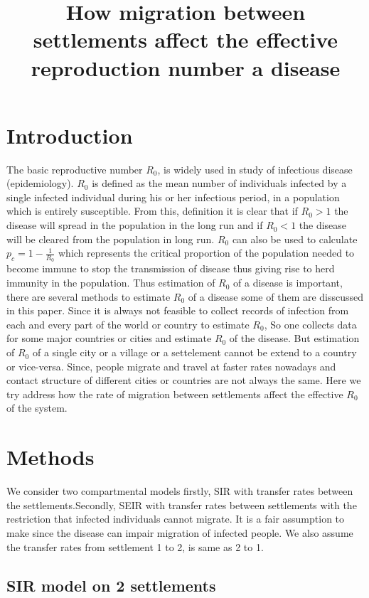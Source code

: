 \documentclass{article}
\begin{document}
\title{How migration between settlements affect the effective
  reproduction number a disease}
\maketitle

\section*{Introduction}
The basic reproductive number $R_{0}$, is widely used in study of
infectious disease (epidemiology). $R_{0}$ is defined as the mean
number of individuals infected by a single infected individual during
his or her infectious period, in a population which is entirely
susceptible. From this, definition it is clear that if $R_{0} > 1$ the
disease will spread in the population in the long run and if $R_{0}<1$
the disease will be cleared from the population in long run. $R_{0}$
can also be used to calculate $p_{c}=1-\frac{1}{R_{0}}$ which
represents the critical proportion of the population needed to become
immune to stop the transmission of disease thus giving rise to herd
immunity in the population.  Thus estimation of $R_{0}$ of a disease
is important, there are several methods to estimate $R_{0}$ of a
disease some of them are disscussed in this paper. Since it is always
not feasible to collect records of infection from each and every part
of the world or country to estimate $R_{0}$, So one collects data for
some major countries or cities and estimate $R_{0}$ of the disease.
But estimation of $R_{0}$ of a single city or a village or a
settelement cannot be extend to a country or vice-versa. Since, people
migrate and travel at faster rates nowadays and contact structure of
different cities or countries are not always the same. Here we try
address how the rate of migration between settlements affect the
effective $R_{0}$ of the system.

\section*{Methods}
We consider two compartmental models firstly, SIR with transfer rates
between the settlements.Secondly, SEIR with transfer rates between
settlements with the restriction that infected individuals cannot
migrate. It is a fair assumption to make since the disease can impair
migration of infected people. We also assume the transfer rates from
settlement 1 to 2, is same as 2 to 1.
\subsection{SIR model on 2 settlements}
\end{document}
